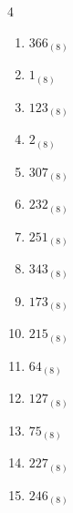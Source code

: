 \begin{multicols}{4}
\begin{enumerate}
  \item $366_{(8)}$

        \phantom{$=246$}

  \item $1_{(8)}$

        \phantom{$=1$}

  \item $123_{(8)}$

        \phantom{$=83$}

  \item $2_{(8)}$

        \phantom{$=2$}

  \item $307_{(8)}$

        \phantom{$=199$}

  \item $232_{(8)}$

        \phantom{$=154$}

\columnbreak %

\resetques

  \item $251_{(8)}$

        \phantom{$=169$}

  \item $343_{(8)}$

        \phantom{$=227$}

  \item $173_{(8)}$

        \phantom{$=123$}

  \item $215_{(8)}$

        \phantom{$=141$}

  \item $64_{(8)}$

        \phantom{$=52$}

  \item $127_{(8)}$

        \phantom{$=87$}

  \item $75_{(8)}$

        \phantom{$=61$}

  \item $227_{(8)}$

        \phantom{$=151$}

  \item $246_{(8)}$

        \phantom{$=166$}


\end{enumerate}
\end{multicols}
